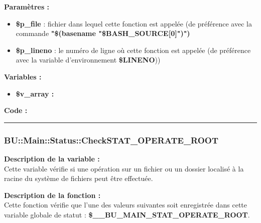 \documentclass[a4paper,10pt]{article}
\begin{document}
\begin{justify}
    \textbf{Paramètres :}
    \begin{itemize}
        \item \color{orange}\textbf{\$p\_file}\color{white} : fichier dans lequel cette fonction est appelée (de préférence avec la commande \textbf{"\$(\color{gray}basename \color{white}"\color{orange}\$BASH\_SOURCE[0]\color{white}")")}\\

        \item \color{orange}\textbf{\$p\_lineno}\color{white} : le numéro de ligne où cette fonction est appelée (de préférence avec la variable d'environnement \textbf{\color{orange}\$LINENO}))
    \end{itemize}
\end{justify}

\begin{justify}
    \textbf{Variables :}

    \begin{itemize}
        \item \textbf{\color{orange}\$v\_array\color{white} :}
    \end{itemize}
\end{justify}

\begin{justify}
    \textbf{Code :}
\end{justify}



\color{blue}\par\noindent\rule{\textwidth}{0.4pt}\color{white}

\color{blue}
\subsubsection{\color{mauve}BU::Main::Status::CheckSTAT\_OPERATE\_ROOT}\color{white}

\begin{justify}
    \textbf{Description de la variable :}\\
    Cette variable vérifie si une opération sur un fichier ou un dossier localisé à la racine du système de fichiers peut être effectuée.
\end{justify}

\begin{justify}
    \textbf{Description de la fonction :}\\
    Cette fonction vérifie que l'une des valeurs suivantes soit enregistrée dans cette variable globale de statut : \textbf{\color{orange}\$\_\_BU\_MAIN\_STAT\_OPERATE\_ROOT}.
\end{justify}
\end{document}
